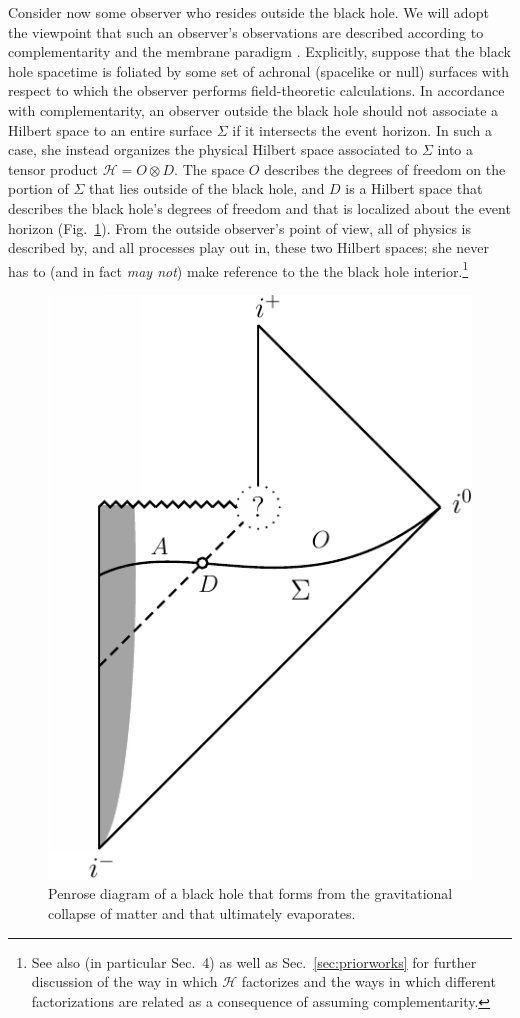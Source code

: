\documentclass[a4paper,11pt]{article}
\newcommand{\hil}{\mathcal{H}}
\theoremstyle{definition}
\newcommand{\Sec}[1]{Sec.~\ref{#1}}
\newcommand{\Fig}[1]{Fig.~\ref{#1}}
\begin{document}
Consider now some observer who resides outside the black hole.
We will adopt the viewpoint that such an observer's observations are described according to complementarity \cite{Susskind:1993if} and the membrane paradigm \cite{Thorne:1986iy}.
Explicitly, suppose that the black hole spacetime is foliated by some set of achronal (spacelike or null) surfaces with respect to which the observer performs field-theoretic calculations.
In accordance with complementarity, an observer outside the black hole should not associate a Hilbert space to an entire surface $\Sigma$ if it intersects the event horizon.
In such a case, she instead organizes the physical Hilbert space associated to $\Sigma$ into a tensor product $\hil = O \otimes D$.
The space $O$ describes the degrees of freedom on the portion of $\Sigma$ that lies outside of the black hole, and $D$ is a Hilbert space that describes the black hole's degrees of freedom and that is localized about the event horizon (\Fig{fig:bhpenrose}).
From the outside observer's point of view, all of physics is described by, and all processes play out in, these two Hilbert spaces; she never has to (and in fact \emph{may not}) make reference to the the black hole interior.\footnote{See also \cite{Nomura:2011dt} (in particular Sec.~4) as well as \Sec{sec:priorworks} for further discussion of the way in which $\mathcal{H}$ factorizes and the ways in which different factorizations are related as a consequence of assuming complementarity.}

\begin{figure}
\centering
\includegraphics[scale=0.75]{bhpenrose.pdf}
\caption{Penrose diagram of a black hole that forms from the gravitational collapse of matter and that ultimately evaporates.}
\label{fig:bhpenrose}
\end{figure}
\end{document}
